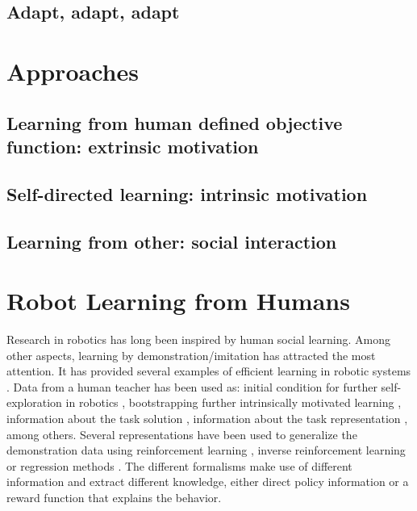 \subsection{Adapt, adapt, adapt}

\section{Approaches}

\subsection{Learning from human defined objective function: extrinsic motivation}

\subsection{Self-directed learning: intrinsic motivation}

\subsection{Learning from other: social interaction}

\section{Robot Learning from Humans}

Research in robotics has long been inspired by human social learning. Among other aspects, learning by demonstration/imitation has attracted the most attention. It has provided several examples of efficient learning in robotic systems \cite{argall09survey,lopes10imitationchapter}. Data from a human teacher has been used as: initial condition for further self-exploration in robotics \cite{nicolescu2003natural}, bootstrapping further intrinsically motivated learning \cite{nguyen2011bootstrapping}, information about the task solution \cite{calinon07}, information about the task representation \cite{macl07affimit}, among others. Several representations have been used to generalize the demonstration data using reinforcement learning \cite{thomaz2008teachable}, inverse reinforcement learning \cite{macl07affimit,Abbeel04icml} or regression methods \cite{calinon07,chernova09jair}. The different formalisms make use of different information and extract different knowledge, either direct policy information or a reward function that explains the behavior.

